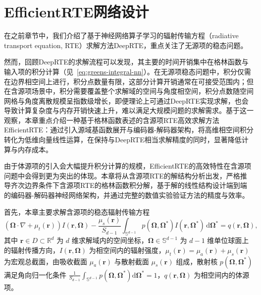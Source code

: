 \chapter{EfficientRTE网络设计} \label{chap:prte}

在之前章节中，我们介绍了基于神经网络算子学习的辐射传输方程（radiative transport equation, RTE）求解方法DeepRTE，重点关注了无源项的稳态问题。

然而，回顾DeepRTE的求解流程可以发现，其主要的时间开销集中在格林函数与输入项的积分计算（见~\eqref{eq:greens-integral-nn}）。在无源项稳态问题中，积分仅需在边界相空间上进行，积分点数量有限，这部分计算开销通常在可接受范围内；但在含源项场景中，积分需要覆盖整个求解域的空间与角度相空间，积分点数随空间网格与角度离散规模呈指数级增长，即便理论上可通过DeepRTE实现求解，也会导致计算复杂度与内存开销快速上升，难以满足大规模问题的求解需求。基于这一观察，本章重点介绍一种基于格林函数表述的含源项RTE高效求解方法EfficientRTE：通过引入源域基函数展开与编码器-解码器架构，将高维相空间积分转化为低维向量线性运算，在保持与DeepRTE相当求解精度的同时，显著降低计算与内存成本。

由于体源项的引入会大幅提升积分计算的规模，EfficientRTE的高效特性在含源项问题中会得到更为突出的体现。本章将从含源项RTE的解结构分析出发，严格推导齐次边界条件下含源项RTE的格林函数积分解，基于解的线性结构设计端到端的编码器-解码器神经网络架构，并通过完整的数值实验验证方法的精度与效率。

首先，本章主要求解含源项的稳态辐射传输方程
\begin{equation}\label{eq:rte-source}
    (\boldsymbol{\Omega}\cdot\nabla + \mu_t(\boldsymbol{r})) I(\boldsymbol{r},\boldsymbol{\Omega})
    - \frac{\mu_s(\boldsymbol{r})}{S_{d-1}} \int_{\mathbb{S}^{d-1}} p(\boldsymbol{\Omega},\boldsymbol{\Omega}^*) I(\boldsymbol{r},\boldsymbol{\Omega}^*)\,\mathrm{d}\boldsymbol{\Omega}^*
    = q(\boldsymbol{r},\boldsymbol{\Omega}),
\end{equation}
其中 $\boldsymbol{r}\in D\subset\mathbb{R}^d$ 为 $d$ 维求解域内的空间坐标，$\boldsymbol{\Omega}\in\mathbb{S}^{d-1}$ 为 $d-1$ 维单位球面上的辐射传播方向，$I(\boldsymbol{r},\boldsymbol{\Omega})$ 为相空间内的辐射强度，$\mu_t(\boldsymbol{r})=\mu_a(\boldsymbol{r})+\mu_s(\boldsymbol{r})$ 为宏观总截面，由吸收截面 $\mu_a(\boldsymbol{r})$ 与散射截面 $\mu_s(\boldsymbol{r})$ 组成，散射核 $p(\boldsymbol{\Omega},\boldsymbol{\Omega}^*)$ 满足角向归一化条件 $\frac{1}{S_{d-1}}\int_{\mathbb{S}^{d-1}} p(\boldsymbol{\Omega},\boldsymbol{\Omega}^*)\mathrm{d}\boldsymbol{\Omega}^*=1$，$q(\boldsymbol{r},\boldsymbol{\Omega})$ 为相空间内的体源项。

